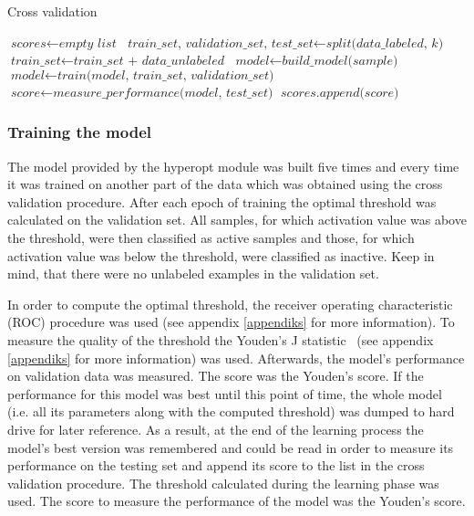 \documentclass[a4paper,10pt]{report}
\begin{document}
	\begin{algorithm}
	\caption{Cross validation}\label{alg:cross_validation}
	\begin{algorithmic}[1]
	\State
	\State $\textit{scores} \gets \textit{empty list}$
	\State
	  \State $\textit{train\_set, validation\_set, test\_set} \gets \textit{split(data\_labeled, k)} $
	  \State $\textit{train\_set} \gets \textit{train\_set + data\_unlabeled}$
	  \State $\textit{model} \gets \textit{build\_model(sample)}$
	  \State $\textit{model} \gets \textit{train(model, train\_set, validation\_set)}$
	  \State $\textit{score} \gets \textit{measure\_performance(model, test\_set)}$
	  \State $\textit{scores.append(score)}$
	\EndFor
	\State       
	\State
	\EndProcedure
	\end{algorithmic}
	\end{algorithm}
	
	\subsubsection{Training the model}
	The model provided by the hyperopt module was built five times and every time it was trained on another part of the data which was obtained using the cross validation procedure. After each epoch of training the optimal threshold was calculated on the validation set. All samples, for which activation value was above the threshold, were then classified as active samples and those, for which activation value was below the threshold, were classified as inactive. Keep in mind, that there were no unlabeled examples in the validation set. %
	
	In order to compute the optimal threshold, the receiver operating characteristic (ROC) procedure was used (see appendix \ref{appendiks} for more information). To measure the quality of the threshold the Youden's J statistic~\cite{YOUDEN} (see appendix \ref{appendiks} for more information) was used. Afterwards, the model's performance on validation data was measured. The score was the Youden's score. If the performance for this model was best until this point of time, the whole model (i.e. all its parameters along with the computed threshold) was dumped to hard drive for later reference. As a result, at the end of the learning process the model's best version was remembered and could be read in order to measure its performance on the testing set and append its score to the list in the cross validation procedure. The threshold calculated during the learning phase was used. The score to measure the performance of the model was the Youden's score. 
	
\end{document}
